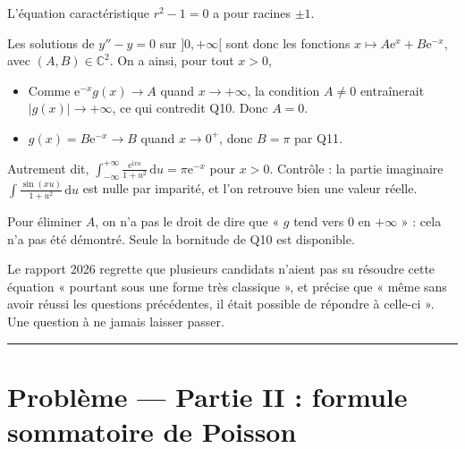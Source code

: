 \documentclass[11pt,a4paper]{article}
\providecommand{\tightlist}{\setlength{\itemsep}{0pt}\setlength{\parskip}{0pt}}
\newcommand{\equationajustee}[1]{%
  \sbox{\boiteequation}{$\displaystyle #1$}%
  \ifdim\wd\boiteequation>\linewidth
    \[\resizebox{\linewidth}{!}{\usebox{\boiteequation}}\]%
  \else
    \[#1\]%
  \fi}
\begin{document}
L'équation caractéristique \(r^2-1=0\) a pour racines \(\pm1\).

Les solutions de \(y''-y=0\) sur \(]0,+\infty[\) sont donc les fonctions \(x\mapsto A{\mathrm{e}}^x+B{\mathrm{e}}^{-x}\), avec \((A,B)\in{\mathbb{C}}^2\). On a ainsi, pour tout \(x>0\),

\equationajustee{g(x)=A{\mathrm{e}}^x+B{\mathrm{e}}^{-x}.}

\begin{itemize}
\tightlist
\item
  Comme \({\mathrm{e}}^{-x}g(x)\to A\) quand \(x\to+\infty\), la condition \(A\neq0\) entraînerait \(|g(x)|\to+\infty\), ce qui contredit Q10. Donc \(A=0\).
\item
  \(g(x)=B{\mathrm{e}}^{-x}\to B\) quand \(x\to0^+\), donc \(B=\pi\) par Q11.
\end{itemize}

\equationajustee{\boxed{\forall x>0,\ g(x)=\pi{\mathrm{e}}^{-x}}}

Autrement dit, \(\int_{-\infty}^{+\infty}\frac{{\mathrm{e}}^{\mathrm{i}xu}}{1+u^2}\,\mathrm{d}u=\pi{\mathrm{e}}^{-x}\) pour \(x>0\). Contrôle : la partie imaginaire \(\int\frac{\sin(xu)}{1+u^2}\,\mathrm{d}u\) est nulle par imparité, et l'on retrouve bien une valeur réelle.

\begin{piege}

Pour éliminer \(A\), on n'a pas le droit de dire que « \(g\) tend vers 0 en \(+\infty\) » : cela n'a pas été démontré. Seule la bornitude de Q10 est disponible.

\end{piege}

\begin{jury}

Le rapport 2026 regrette que plusieurs candidats n'aient pas su résoudre cette équation « pourtant sous une forme très classique », et précise que « même sans avoir réussi les questions précédentes, il était possible de répondre à celle-ci ». Une question à ne jamais laisser passer.

\end{jury}

\begin{center}\rule{0.5\linewidth}{0.5pt}\end{center}

\hypertarget{probluxe8me-partie-ii-formule-sommatoire-de-poisson}{%
\section{Problème --- Partie II : formule sommatoire de Poisson}\label{probluxe8me-partie-ii-formule-sommatoire-de-poisson}}
\end{document}
